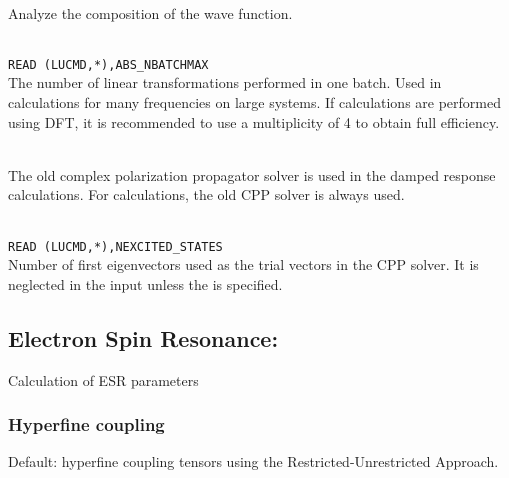 \begin{description}
\item{} \\
   Analyze the composition of the wave function.

\item{}     \\
\verb|READ (LUCMD,*),ABS_NBATCHMAX|\\
   The number of linear transformations performed in one batch. Used in
calculations for many frequencies on large systems.
If calculations are performed using DFT, it is recommended to use
a multiplicity of 4 to obtain full efficiency. 

\item{}\\
 The old complex polarization propagator
solver \cite{pndmbhjajjojcp123,pndmbhjajjojcp115} is used
in the damped response calculations. For {} calculations, the
old CPP solver is always used.
\item{}\\
\verb|READ (LUCMD,*),NEXCITED_STATES|\\
 Number of first eigenvectors used as the trial vectors in the CPP solver.
It is neglected in the input unless the
{} is specified.

\end{description}
\subsection{Electron Spin Resonance: }

Calculation of ESR parameters

\subsubsection{Hyperfine coupling}

Default: hyperfine coupling tensors using
the Restricted-Unrestricted Approach.


